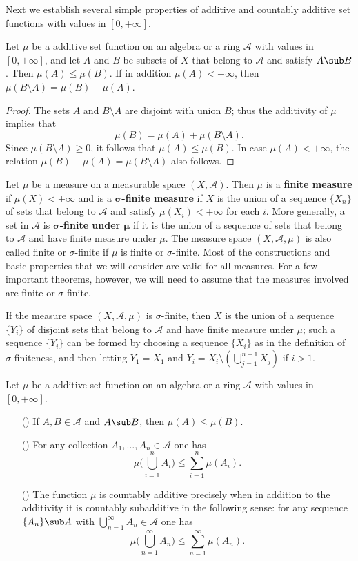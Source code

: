 Next we establish several simple properties of additive and countably additive set functions with values in $[0,+\infty]$.
\begin{proposition}\label{measure additive on difference}
Let $\mu$ be a additive set function on an algebra or a ring $\mathcal{A}$ with values in $[0,+\infty]$, and let $A$ and $B$ be subsets of $X$ that belong to $\mathcal{A}$ and satisfy $A\sub B$. Then $\mu(A)\leq\mu(B)$. If in addition $\mu(A)<+\infty$, then $\mu(B\setminus A)=\mu(B)-\mu(A)$.
\end{proposition}
\begin{proof}
The sets $A$ and $B\setminus A$ are disjoint with union $B$; thus the
additivity of $\mu$ implies that
\[\mu(B)=\mu(A)+\mu(B\setminus A).\]
Since $\mu(B\setminus A)\geq 0$, it follows that $\mu(A)\leq\mu(B)$. In case $\mu(A)<+\infty$, the relation $\mu(B)-\mu(A)=\mu(B\setminus A)$ also follows.
\end{proof}
Let $\mu$ be a measure on a measurable space $(X,\mathcal{A})$. Then $\mu$ is a \textbf{finite measure} if $\mu(X)<+\infty$ and is a \textbf{$\bm{\sigma}$-finite measure} if $X$ is the union of a sequence $\{X_n\}$ of sets that belong to $\mathcal{A}$ and satisfy $\mu(X_i)<+\infty$ for each $i$. More generally, a set in $\mathcal{A}$ is \textbf{$\bm{\sigma}$-finite under $\bm{\mu}$} if it is the union of a sequence of sets that belong to $\mathcal{A}$ and have finite measure under $\mu$. The measure space $(X,\mathcal{A},\mu)$ is also called finite or $\sigma$-finite if $\mu$ is finite or $\sigma$-finite. Most of the constructions and basic properties that we will consider are valid for all measures. For a few important theorems, however, we will need to assume that the measures involved are finite or $\sigma$-finite.\par
If the measure space $(X,\mathcal{A},\mu)$ is $\sigma$-finite, then $X$ is the union of a sequence $\{Y_i\}$ of disjoint sets that belong to $\mathcal{A}$ and have finite measure under $\mu$; such a sequence $\{Y_i\}$ can be formed by choosing a sequence $\{X_i\}$ as in the definition of $\sigma$-finiteness, and then letting $Y_1=X_1$ and $Y_i=X_i\setminus(\bigcup_{j=1}^{n-1}X_j)$ if $i>1$.
\begin{proposition}\label{measure sigma-additive iff subadd}
Let $\mu$ be a additive set function on an algebra or a ring $\mathcal{A}$ with values in $[0,+\infty]$.
\begin{itemize}
\item[(\rmnum{1})] If $A,B\in\mathcal{A}$ and $A\sub B$, then $\mu(A)\leq\mu(B)$.
\item[(\rmnum{2})] For any collection $A_1,\dots,A_n\in\mathcal{A}$ one has
\[\mu\Big(\bigcup_{i=1}^{n}A_i\Big)\leq\sum_{i=1}^{n}\mu(A_i).\]
\item[(\rmnum{3})] The function $\mu$ is countably additive precisely when in addition to the additivity it is countably subadditive in the following sense: for any 
sequence $\{A_n\}\sub A$ with $\bigcup_{n=1}^{\infty}A_n\in\mathcal{A}$ one has
\[\mu\Big(\bigcup_{n=1}^{\infty}A_n\Big)\leq\sum_{n=1}^{\infty}\mu(A_n).\]
\end{itemize}
\end{proposition}
